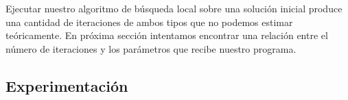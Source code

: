Ejecutar nuestro algoritmo de b\'usqueda local sobre una soluci\'on inicial produce una cantidad de iteraciones de ambos tipos que no podemos estimar te\'oricamente. En pr\'oxima secci\'on intentamos encontrar una relaci\'on entre el n\'umero de iteraciones y los par\'ametros que recibe nuestro programa.

\subsection{Experimentación}

